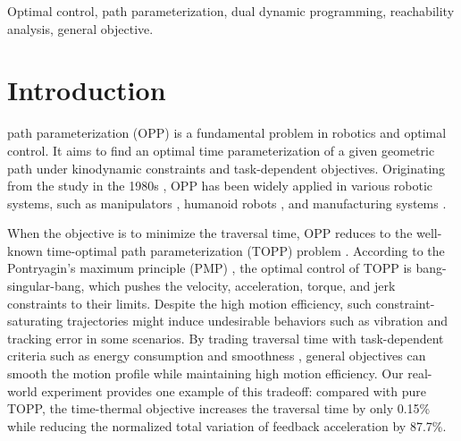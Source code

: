 \documentclass[journal]{IEEEtran}
\theoremstyle{definition}
\theoremstyle{definition}
\begin{document}
\begin{IEEEkeywords}
    Optimal control, path parameterization, dual dynamic programming, reachability analysis, general objective.
\end{IEEEkeywords}

\IEEEpeerreviewmaketitle

\section{Introduction}\label{sec:Introduction}

 path parameterization (OPP) is a fundamental problem in robotics and optimal control. It aims to find an optimal time parameterization of a given geometric path under kinodynamic constraints and task-dependent objectives. Originating from the study in the 1980s \cite{bobrow1985time,shin1985minimum,shin1986dynamic}, OPP has been widely applied in various robotic systems, such as manipulators \cite{verscheure2009time,debrouwere2013time,wang2022third}, humanoid robots \cite{pham2018new,hauser2014fast}, and manufacturing systems \cite{wang2026online,xu2025real}.

When the objective is to minimize the traversal time, OPP reduces to the well-known time-optimal path parameterization (TOPP) problem \cite{pham2018new}. According to the Pontryagin's maximum principle (PMP) \cite{pontryagin1987mathematical}, the optimal control of TOPP is bang-singular-bang, which pushes the velocity, acceleration, torque, and jerk constraints to their limits. Despite the high motion efficiency, such constraint-saturating trajectories might induce undesirable behaviors such as vibration and tracking error in some scenarios. By trading traversal time with task-dependent criteria such as energy consumption and smoothness \cite{verscheure2009time,kaserer2019nearly}, general objectives can smooth the motion profile while maintaining high motion efficiency. Our real-world experiment provides one example of this tradeoff: compared with pure TOPP, the time-thermal objective increases the traversal time by only 0.15\% while reducing the normalized total variation of feedback acceleration by 87.7\%.
\end{document}
